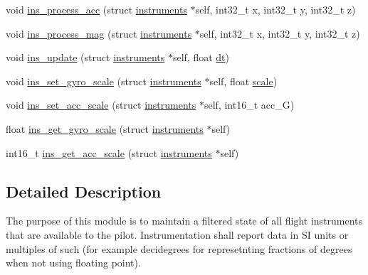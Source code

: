\begin{DoxyCompactItemize}
void \hyperlink{group__Instrument_gac934734b50dd3838f4d8056a20e714b6}{ins\+\_\+process\+\_\+acc} (struct \hyperlink{structinstruments}{instruments} $\ast$self, int32\+\_\+t x, int32\+\_\+t y, int32\+\_\+t z)
\item 
void \hyperlink{group__Instrument_gab819d65960b422c029b6b65c5e093615}{ins\+\_\+process\+\_\+mag} (struct \hyperlink{structinstruments}{instruments} $\ast$self, int32\+\_\+t x, int32\+\_\+t y, int32\+\_\+t z)
\item 
void \hyperlink{group__Instrument_ga126803b1bfe06b359e1f812a6953c521}{ins\+\_\+update} (struct \hyperlink{structinstruments}{instruments} $\ast$self, float \hyperlink{flight__pid__unittest_8cc_a778e38aa889751afffa2dea6b803e67a}{dt})
\item 
void \hyperlink{group__Instrument_ga8e657ac124286cdeea89e840aa8cf8ce}{ins\+\_\+set\+\_\+gyro\+\_\+scale} (struct \hyperlink{structinstruments}{instruments} $\ast$self, float \hyperlink{flight_2mixer_8h_ac0fa494f6c5a0127e958b5e43314bf0a}{scale})
\item 
void \hyperlink{group__Instrument_ga1ba92852bf4d128d58ce5ffa91a55b4e}{ins\+\_\+set\+\_\+acc\+\_\+scale} (struct \hyperlink{structinstruments}{instruments} $\ast$self, int16\+\_\+t acc\+\_\+G)
\item 
float \hyperlink{group__Instrument_ga484a36442f8829e80e3c9a4e17fba98e}{ins\+\_\+get\+\_\+gyro\+\_\+scale} (struct \hyperlink{structinstruments}{instruments} $\ast$self)
\item 
int16\+\_\+t \hyperlink{group__Instrument_ga2e39f0bab09c23f3cb28bef884a301cb}{ins\+\_\+get\+\_\+acc\+\_\+scale} (struct \hyperlink{structinstruments}{instruments} $\ast$self)
\end{DoxyCompactItemize}


\subsection{Detailed Description}
The purpose of this module is to maintain a filtered state of all flight instruments that are available to the pilot. Instrumentation shall report data in S\+I units or multiples of such (for example decidegrees for represetnting fractions of degrees when not using floating point). 

